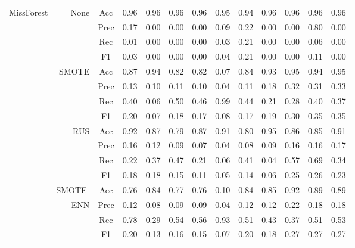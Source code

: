 \begin{table*}
\begin{narrow}{-1cm}{-1cm}
\begin{subtable}[t]{2.05\columnwidth}
\begin{tabular}{l|r|c|cccccccccc}
        MissForest & None & Acc & 0.96 & 0.96 & 0.96 & 0.96 & 0.95 & 0.94 & 0.96 & 0.96 & 0.96 & 0.96 \\
        ~ & ~ & Prec & 0.17 & 0.00 & 0.00 & 0.00 & 0.09 & 0.22 & 0.00 & 0.00 & 0.80 & 0.00 \\
        ~ & ~ & Rec & 0.01 & 0.00 & 0.00 & 0.00 & 0.03 & 0.21 & 0.00 & 0.00 & 0.06 & 0.00 \\
        ~ & ~ & F1 & 0.03 & 0.00 & 0.00 & 0.00 & 0.04 & 0.21 & 0.00 & 0.00 & 0.11 & 0.00 \\
        \cline{2-13}
        ~ & SMOTE & Acc & 0.87 & 0.94 & 0.82 & 0.82 & 0.07 & 0.84 & 0.93 & 0.95 & 0.94 & 0.95 \\
        ~ & ~ & Prec & 0.13 & 0.10 & 0.11 & 0.10 & 0.04 & 0.11 & 0.18 & 0.32 & 0.31 & 0.33 \\
        ~ & ~ & Rec & 0.40 & 0.06 & 0.50 & 0.46 & 0.99 & 0.44 & 0.21 & 0.28 & 0.40 & 0.37 \\
        ~ & ~ & F1 & 0.20 & 0.07 & 0.18 & 0.17 & 0.08 & 0.17 & 0.19 & 0.30 & 0.35 & 0.35 \\
        \cline{2-13}
        ~ & RUS & Acc & 0.92 & 0.87 & 0.79 & 0.87 & 0.91 & 0.80 & 0.95 & 0.86 & 0.85 & 0.91 \\
        ~ & ~ & Prec & 0.16 & 0.12 & 0.09 & 0.07 & 0.04 & 0.08 & 0.09 & 0.16 & 0.16 & 0.17 \\
        ~ & ~ & Rec & 0.22 & 0.37 & 0.47 & 0.21 & 0.06 & 0.41 & 0.04 & 0.57 & 0.69 & 0.34 \\
        ~ & ~ & F1 & 0.18 & 0.18 & 0.15 & 0.11 & 0.05 & 0.14 & 0.06 & 0.25 & 0.26 & 0.23 \\
        \cline{2-13}
        ~ & SMOTE- & Acc & 0.76 & 0.84 & 0.77 & 0.76 & 0.10 & 0.84 & 0.85 & 0.92 & 0.89 & 0.89 \\
        ~ & ENN & Prec & 0.12 & 0.08 & 0.09 & 0.09 & 0.04 & 0.12 & 0.12 & 0.22 & 0.18 & 0.18 \\
        ~ & ~ & Rec & 0.78 & 0.29 & 0.54 & 0.56 & 0.93 & 0.51 & 0.43 & 0.37 & 0.51 & 0.53 \\
        ~ & ~ & F1 & 0.20 & 0.13 & 0.16 & 0.15 & 0.07 & 0.20 & 0.18 & 0.27 & 0.27 & 0.27 \\
        \hline\hline
        

\end{tabular}
\end{subtable}
\end{narrow}
\end{table*}
